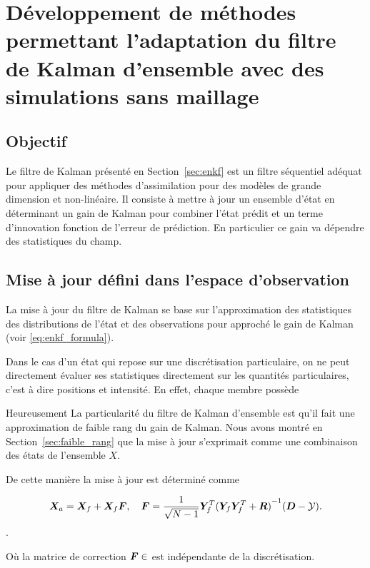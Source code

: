 
\section{Développement de méthodes permettant l'adaptation du filtre de Kalman d'ensemble avec des simulations sans maillage}

\subsection{Objectif}
Le filtre de Kalman présenté en Section~\ref*{sec:enkf} est un filtre séquentiel adéquat pour appliquer des méthodes d'assimilation pour des modèles de grande dimension et non-linéaire. Il consiste à mettre à jour un ensemble d'état en déterminant un gain de Kalman pour combiner l'état prédit et un terme d'innovation fonction de l'erreur de prédiction. En particulier ce gain va dépendre des statistiques du champ.

\subsection{Mise à jour défini dans l'espace d'observation}

La mise à jour du filtre de Kalman se base sur l'approximation des statistiques des distributions de l'état et des observations pour approché le gain de Kalman (voir \eqref{eq:enkf_formula}).

Dans le cas d'un état qui repose sur une discrétisation particulaire, on ne peut directement évaluer ses statistiques directement sur les quantités particulaires, c'est à dire positions et intensité. En effet, chaque membre possède


Heureusement La particularité du filtre de Kalman d'ensemble est qu'il fait une approximation de faible rang du gain de Kalman. Nous avons montré en Section~\ref{sec:faible_rang} que la mise à jour s'exprimait comme une combinaison des états de l'ensemble $X$.

De cette manière la mise à jour est déterminé comme

\begin{equation*}
    \bm{X}_a = \bm{X}_f + \bm{X}_f \bm{F}, \quad \bm{F} = \frac{1}{\sqrt{N-1}} \bm Y_f^T {(\bm Y_f \bm Y_f^T + \bm R)}^{-1}(\bm{D} - \mathcal{Y}).
\end{equation*}.

Où la matrice de correction $\bm{F} \in $ est indépendante de la discrétisation.

